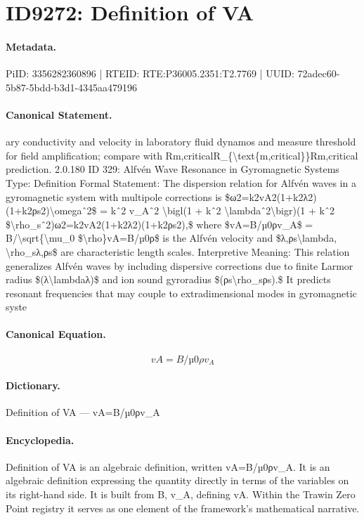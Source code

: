\section*{ID9272: Definition of VA}
\paragraph{Metadata.}
PiID: 3356282360896 | RTEID: RTE:P36005.2351:T2.7769 | UUID: 72adec60-5b87-5bdd-b3d1-4345aa479196

\paragraph{Canonical Statement.}
ary conductivity and velocity in laboratory fluid dynamos and measure threshold for field amplification; compare with Rm,criticalR\_\{\textbackslash{}text\{m,critical\}\}Rm,critical prediction. 2.0.180 ID 329: Alfvén Wave Resonance in Gyromagnetic Systems Type: Definition Formal Statement: The dispersion relation for Alfvén waves in a gyromagnetic system with multipole corrections is \$ω2=k2vA2(1+k2λ2)(1+k2ρs2)\textbackslash{}omegaˆ2\$ = kˆ2 v\_Aˆ2 \textbackslash{}bigl(1 + kˆ2 \textbackslash{}lambdaˆ2\textbackslash{}bigr)(1 + kˆ2 \$\textbackslash{}rho\_sˆ2)ω2=k2vA2(1+k2λ2)(1+k2ρs2),\$ where \$vA=B/µ0ρv\_A\$ = B/\textbackslash{}sqrt\{\textbackslash{}mu\_0 \$\textbackslash{}rho\}vA=B/µ0ρ\$ is the Alfvén velocity and \$λ,ρs\textbackslash{}lambda, \textbackslash{}rho\_sλ,ρs\$ are characteristic length scales. Interpretive Meaning: This relation generalizes Alfvén waves by including dispersive corrections due to finite Larmor radius \$(λ\textbackslash{}lambdaλ)\$ and ion sound gyroradius \$(ρs\textbackslash{}rho\_sρs).\$ It predicts resonant frequencies that may couple to extradimensional modes in gyromagnetic syste

\paragraph{Canonical Equation.}
\[
vA=B/µ0ρv_A
\]

\paragraph{Dictionary.}
Definition of VA — vA=B/µ0ρv\_A

\paragraph{Encyclopedia.}
Definition of VA is an algebraic definition, written vA=B/µ0ρv\_A. It is an algebraic definition expressing the quantity directly in terms of the variables on its right-hand side. It is built from B, v\_A, defining vA. Within the Trawin Zero Point registry it serves as one element of the framework's mathematical narrative.
